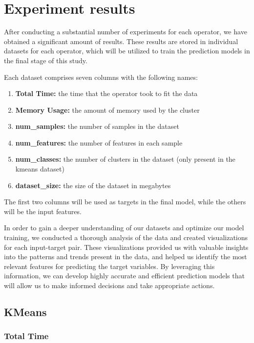\documentclass[conference]{IEEEtran}
\begin{document}
\section{Experiment results}
After conducting a substantial number of experiments for each operator, we have obtained a significant amount of results. These results are stored in individual datasets for each operator, which will be utilized to train the prediction models in the final stage of this study.

Each dataset comprises seven columns with the following names:

\begin{enumerate}
    \item {\textbf{Total Time:} the time that the operator took to fit the data}
    \item {\textbf{Memory Usage:} the amount of memory used by the cluster}
    \item {\textbf{num\_samples:} the number of samples in the dataset}
    \item {\textbf{num\_features:} the number of features in each sample}
    \item {\textbf{num\_classes:} the number of clusters in the dataset (only present in the kmeans dataset)}
    \item {\textbf{dataset\_size:}} the size of the dataset in megabytes
\end{enumerate}

The first two columns will be used as targets in the final model, while the others will be the input features. 

In order to gain a deeper understanding of our datasets and optimize our model training, we conducted a thorough analysis of the data and created visualizations for each input-target pair.
These visualizations provided us with valuable insights into the patterns and trends present in the data, and helped us identify the most relevant features for predicting the target variables.
By leveraging this information, we can develop highly accurate and efficient prediction models that will allow us to make informed decisions and take appropriate actions.

\subsection{KMeans}


\subsubsection{\textbf{Total Time}}
\end{document}
